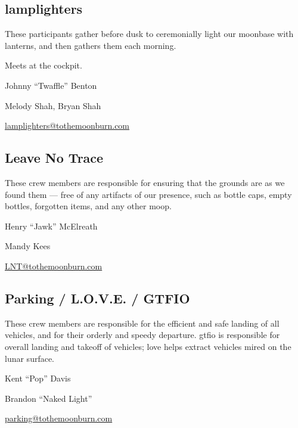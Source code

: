 \subsection*{\Gls{lamplighters}}
These participants gather before dusk to ceremonially light our moonbase with lanterns, and then gathers them each morning.   

Meets at the \gls{cockpit}.

\begin{description}[leftmargin=6em,noitemsep,style=nextline]
   \item[Lead:] Johnny ``Twaffle'' Benton
   \item[Co-leads:] Melody Shah,  Bryan Shah
   \item[Contact:] \url{lamplighters@tothemoonburn.com}
\end{description}


\subsection*{Leave No Trace}
These crew members are responsible for ensuring that the grounds are as we found them --- free of any artifacts of our presence, such as bottle caps, empty bottles, forgotten items, and any other \gls{moop}.

\begin{description}[leftmargin=6em,noitemsep,style=nextline]
   \item[Lead:] Henry ``Jawk'' McElreath
   \item[Co-leads:] Mandy Kees
   \item[Contact:] \url{LNT@tothemoonburn.com}
\end{description}


\subsection*{Parking / L.O.V.E. / GTFIO}
These crew members are responsible for the efficient and safe landing of all vehicles, and for their orderly and speedy departure.  \Gls{gtfio} is responsible for overall landing and takeoff of vehicles; \gls{love} helps extract vehicles mired on the lunar surface.

\begin{description}[leftmargin=6em,noitemsep,style=nextline]
   \item[Lead:] Kent ``Pop'' Davis
   \item[Co-leads:] Brandon ``Naked Light''
   \item[Contact:] \url{parking@tothemoonburn.com}
\end{description}


